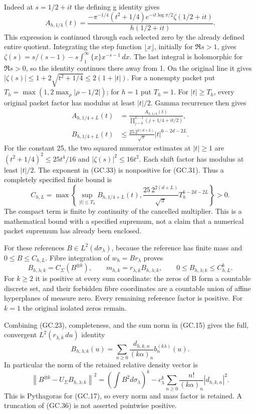 \documentclass[11pt]{article}
\begin{document}
Indeed at $s=1/2+it$ the defining g identity gives
\[
 A_{h,1/4}(t)=
 \frac{-\pi^{-1/4}(t^2+1/4)e^{-it\log\pi/2}
                  \zeta(1/2+it)}{h(1/2+it)}.                  \tag{GC.32}
\]
This expression is continued through each selected zero by the
already defined entire quotient. Integrating the step function
$\lfloor x\rfloor$, initially for $\Re s>1$, gives
$\zeta(s)=s/(s-1)-s\int_1^\infty\{x\}x^{-s-1}\,dx$.
The last integral is holomorphic for $\Re s>0$, so the identity
continues there away from 1. On the original line it gives
$|\zeta(s)|\le1+2\sqrt{t^2+1/4}\le2(1+|t|)$.
For a nonempty packet put
$T_h=\max(1,2\max_\rho|\rho-1/2|)$; for $h=1$ put $T_h=1$.
For $|t|\ge T_h$, every original packet factor has modulus at
least $|t|/2$. Gamma recurrence then gives
\[
 \begin{split}
 A_{h,1/4+L}(t)&=
   \frac{A_{h,1/4}(t)}{\prod_{j=0}^{L-1}(j+1/4+it/2)},\\
 B_{h,1/4+L}(t)&\le
       \frac{25\,2^{2(d+L)}}{\sqrt\pi}|t|^{6-2d-2L}.
 \end{split}                                                   \tag{GC.33}
\]
For the constant 25, the two squared numerator estimates at $|t|\ge1$
are $(t^2+1/4)^2\le25t^4/16$ and
$|\zeta(s)|^2\le16t^2$. Each shift factor has modulus at least
$|t|/2$. The exponent in (GC.33) is nonpositive for (GC.31).
Thus a completely specified finite bound is
\[
 C_{h,L}=\max\left\{
 \sup_{|t|\le T_h}B_{h,1/4+L}(t),
 \frac{25\,2^{2(d+L)}}{\sqrt\pi}T_h^{6-2d-2L}\right\}>0.
                                                               \tag{GC.34}
\]
The compact term is finite by continuity of the cancelled multiplier.
This is a mathematical bound with a specified supremum, not a claim
that a numerical packet supremum has already been enclosed.

For these references $B\in L^2(d\sigma_\lambda)$, because the
reference has finite mass and $0\le B\le C_{h,L}$. Fibre integration
of $w_h=Br_\lambda$ proves
\[
 B_{h,\lambda;k}=C_\Sigma(B^{\otimes k}),\qquad
 m_{h,k}=r_{\lambda,k}B_{h,\lambda;k},\qquad
 0\le B_{h,\lambda;k}\le C_{h,L}^k.                            \tag{GC.35}
\]
For $k\ge2$ it is positive at every sum coordinate: the zeros of B
form a countable discrete set, and their forbidden fibre coordinates
are a countable union of affine hyperplanes of measure zero. Every
remaining reference factor is positive. For $k=1$ the original
isolated zeros remain.

Combining (GC.23), completeness, and the sum norm in (GC.15) gives
the full, convergent $L^2(r_{\lambda,k}\,du)$ identity
\[
 B_{h,\lambda;k}(u)=\sum_{n\ge0}
                \frac{d_{h,k,n}}{(k\alpha)_n}b_n^{(k\lambda)}(u).
                                                               \tag{GC.36}
\]
In particular the norm of the retained relative density vector is
\[
 \left\|B^{\otimes k}-U_\Sigma B_{h,\lambda;k}\right\|^2
   =\left(\int B^2d\sigma_\lambda\right)^k
      -c_\lambda^k\sum_{n\ge0}
                       \frac{n!}{(k\alpha)_n}|d_{h,k,n}|^2.
                                                               \tag{GC.37}
\]
This is Pythagoras for (GC.17), so every norm and mass factor is
retained. A truncation of (GC.36) is not asserted pointwise positive.
\end{document}
